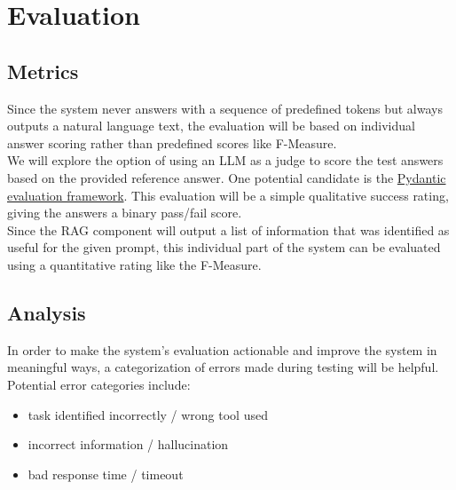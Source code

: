 \documentclass{article}
\begin{document}
\section{Evaluation}

\subsection{Metrics}
Since the system never answers with a sequence of predefined tokens but always outputs a natural language text, the evaluation will be based on individual answer scoring rather than predefined scores like F-Measure.\\

We will explore the option of using an LLM as a judge to score the test answers based on the provided reference answer. One potential candidate is the \href{https://ai.pydantic.dev/evals/#evaluation-with-llmjudge}{Pydantic evaluation framework}. This evaluation will be a simple qualitative success rating, giving the answers a binary pass/fail score.\\

Since the RAG component will output a list of information that was identified as useful for the given prompt, this individual part of the system can be evaluated using a quantitative rating like the F-Measure.

\subsection{Analysis}
In order to make the system's evaluation actionable and improve the system in meaningful ways, a categorization of errors made during testing will be helpful. Potential error categories include:
\begin{itemize}
    \item task identified incorrectly / wrong tool used
    \item incorrect information / hallucination
    \item bad response time / timeout
\end{itemize}
\end{document}
